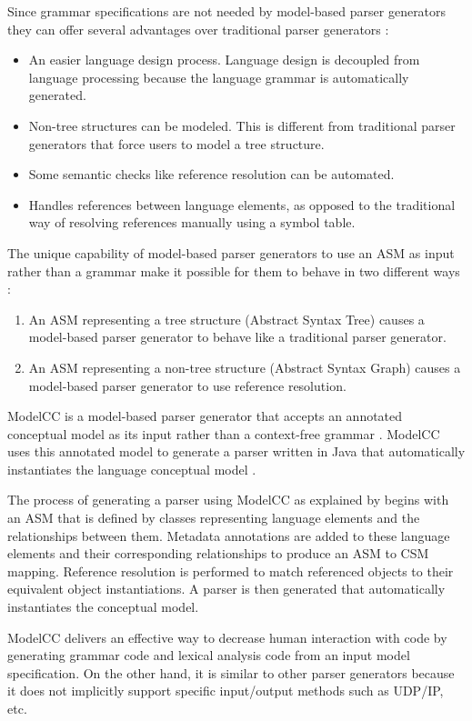 \indent
Since grammar specifications are not needed by model-based parser generators they can offer several advantages over traditional parser generators \cite{quesada_02}:
\begin{itemize}
  \item An easier language design process.  Language design is decoupled from language processing because the language grammar is automatically generated.
  \item Non-tree structures can be modeled.  This is different from traditional parser generators that force users to model a tree structure.
  \item Some semantic checks like reference resolution can be automated.
  \item Handles references between language elements, as opposed to the traditional way of resolving references manually using a symbol table.
\end{itemize}

\indent
The unique capability of model-based parser generators to use an ASM as input rather than a grammar make it possible for them to behave in two different ways \cite{quesada_02}:
\begin{enumerate}
  \item An ASM representing a tree structure (Abstract Syntax Tree) causes a model-based parser generator to behave like a traditional parser generator.
  \item An ASM representing a non-tree structure (Abstract Syntax Graph) causes a model-based parser generator to use reference resolution.
\end{enumerate} 

\indent
ModelCC is a model-based parser generator that accepts an annotated conceptual model as its input rather than a context-free grammar \cite{quesada_01}.  ModelCC uses this annotated model to generate a parser written in Java that automatically instantiates the language conceptual model \cite{quesada_01, modelcc_01}.

\indent
The process of generating a parser using ModelCC as explained by \cite{quesada_02} begins with an ASM that is defined by classes representing language elements and the relationships between them.  Metadata annotations are added to these language elements and their corresponding relationships to produce an ASM to CSM mapping.  Reference resolution is performed to match referenced objects to their equivalent object instantiations.  A parser is then generated that automatically instantiates the conceptual model.

\indent
ModelCC delivers an effective way to decrease human interaction with code by generating grammar code and lexical analysis code from an input model specification.  On the other hand, it is similar to other parser generators because it does not implicitly support specific input/output methods such as UDP/IP, etc.

